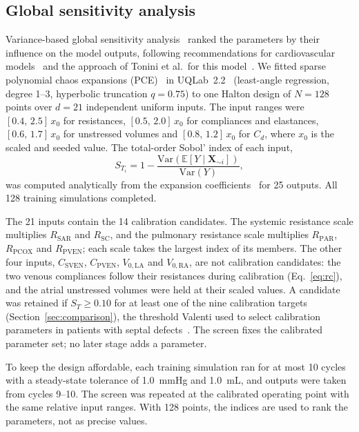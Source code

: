 \documentclass{article}
\begin{document}
\subsection{Global sensitivity analysis}
\label{sec:gsa}
Variance-based global sensitivity analysis~\cite{Sobol2001,Saltelli2010} ranked the parameters by their influence on the model outputs, following recommendations for cardiovascular models~\cite{Eck2016} and the approach of Tonini et al.\ for this model~\cite{Tonini2025}. We fitted sparse polynomial chaos expansions (PCE)~\cite{Blatman2011} in UQLab~2.2~\cite{Marelli2014} (least-angle regression, degree 1--3, hyperbolic truncation $q = 0.75$) to one Halton design of $N = 128$ points over $d = 21$ independent uniform inputs. The input ranges were $[0.4,\,2.5]\,x_0$ for resistances, $[0.5,\,2.0]\,x_0$ for compliances and elastances, $[0.6,\,1.7]\,x_0$ for unstressed volumes and $[0.8,\,1.2]\,x_0$ for $C_d$, where $x_0$ is the scaled and seeded value. The total-order Sobol' index of each input,
\begin{equation}
S_{T_i} = 1 - \frac{\mathrm{Var}\!\left(\mathbb{E}\left[Y \mid \mathbf{X}_{\sim i}\right]\right)}{\mathrm{Var}(Y)},
\label{eq:sobol}
\end{equation}
was computed analytically from the expansion coefficients~\cite{Sudret2008} for 25 outputs. All 128 training simulations completed.

The 21 inputs contain the 14 calibration candidates. The systemic resistance scale multiplies $R_{\mathrm{SAR}}$ and $R_{\mathrm{SC}}$, and the pulmonary resistance scale multiplies $R_{\mathrm{PAR}}$, $R_{\mathrm{PCOX}}$ and $R_{\mathrm{PVEN}}$; each scale takes the largest index of its members. The other four inputs, $C_{\mathrm{SVEN}}$, $C_{\mathrm{PVEN}}$, $V_{0,\mathrm{LA}}$ and $V_{0,\mathrm{RA}}$, are not calibration candidates: the two venous compliances follow their resistances during calibration (Eq.~\ref{eq:rc}), and the atrial unstressed volumes were held at their scaled values. A candidate was retained if $S_{T} \ge 0.10$ for at least one of the nine calibration targets (Section~\ref{sec:comparison}), the threshold Valenti used to select calibration parameters in patients with septal defects~\cite{Valenti2023}. The screen fixes the calibrated parameter set; no later stage adds a parameter.

To keep the design affordable, each training simulation ran for at most 10 cycles with a steady-state tolerance of 1.0~mmHg and 1.0~mL, and outputs were taken from cycles 9--10. The screen was repeated at the calibrated operating point with the same relative input ranges. With 128 points, the indices are used to rank the parameters, not as precise values.
\end{document}
